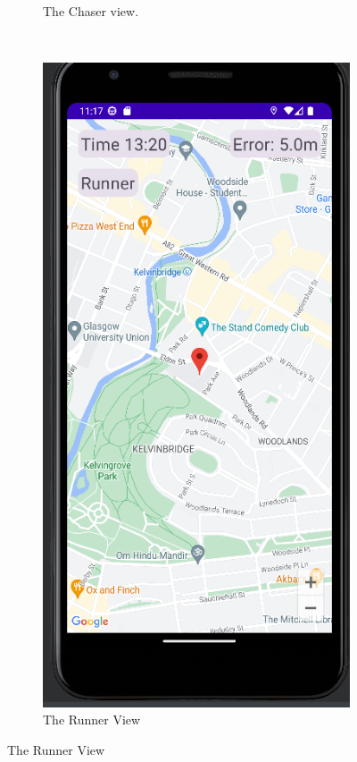 \documentclass{l4proj}
\begin{document}
\begin{figure}
\begin{subfigure}[b]{0.25\textwidth}
        \caption{The Chaser view.}
        \label{fig:phase1_ui_chaser}
    \end{subfigure}
    ~ %
    \begin{subfigure}[b]{0.25\textwidth}
        \includegraphics[width=\textwidth]{images/ui_runner.png}
        \caption{The Runner View}
        \label{fig:phase1_ui_runner}
    \end{subfigure}
    

\end{figure}
\end{document}
